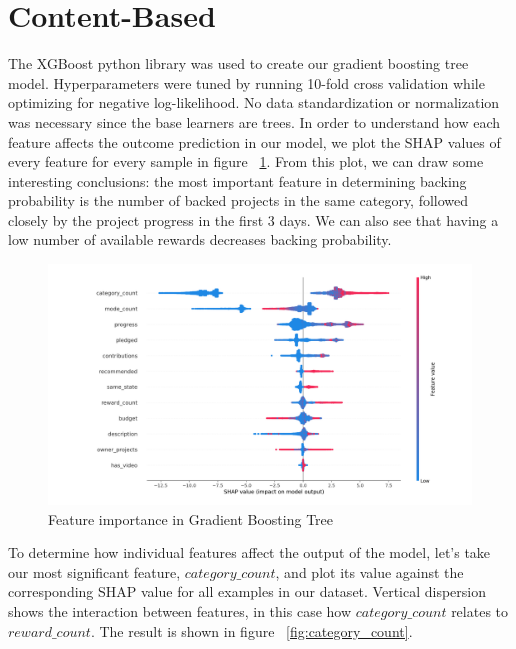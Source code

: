 \documentclass[cic,tc,english]{iiufrgs}
\begin{document}
\section{Content-Based}
The XGBoost python library was used to create our gradient boosting tree model. Hyperparameters were tuned by running 10-fold cross validation while optimizing for negative log-likelihood. No data standardization or normalization was necessary since the base learners are trees. In order to understand how each feature affects the outcome prediction in our model, we plot the SHAP \cite{Lundberg2017} values of every feature for every sample in figure ~\ref{fig:features_importance}. From this plot, we can draw some interesting conclusions: the most important feature in determining backing probability is the number of backed projects in the same category, followed closely by the project progress in the first 3 days. We can also see that having a low number of available rewards decreases backing probability.

\begin{figure}
    \caption{Feature importance in Gradient Boosting Tree}
    \begin{center}
        \includegraphics[width=\textwidth]{feature_contribution}
    \end{center}
    \label{fig:features_importance}
\end{figure}

To determine how individual features affect the output of the model, let's take our most significant feature, $category\_count$, and plot its value against the corresponding SHAP value for all examples in our dataset. Vertical dispersion shows the interaction between features, in this case how $category\_count$ relates to $reward\_count$. The result is shown in figure ~\ref{fig:category_count}.
\end{document}

